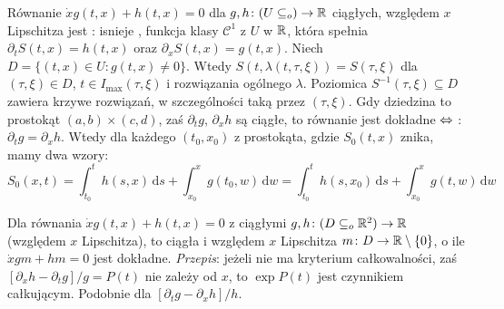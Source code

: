 Równanie $\dot x g(t, x) + h(t, x) = 0$ dla $g, h \colon (U \subseteq_o) \to \mathbb{R}$ ciągłych, względem $x$ Lipschitza jest : isnieje , funkcja klasy $\mathscr C^1$ z $U$ w $\mathbb{R}$, która spełnia $\partial_t S (t, x) = h(t, x)$ oraz $\partial_x S(t, x) = g(t, x)$.
Niech $D = \{(t, x) \in U: g(t, x) \neq 0\}$.
Wtedy $S(t, \lambda(t, \tau, \xi)) = S(\tau, \xi)$ dla $(\tau, \xi) \in D$, $t \in I_{\max}(\tau, \xi)$ i rozwiązania ogólnego $\lambda$.
Poziomica $S^{-1} (\tau, \xi) \subseteq D$ zawiera krzywe rozwiązań, w szczególności taką przez $(\tau, \xi)$.
Gdy dziedzina to prostokąt $(a,b) \times (c,d)$, zaś $\partial_tg$, $\partial_xh$ są ciągłe, to równanie jest dokładne $\Leftrightarrow$ : $\partial_t g = \partial_x h$.
Wtedy dla każdego $(t_0, x_0)$ z prostokąta, gdzie $S_0(t,x)$ znika, mamy dwa wzory:
\[
	S_0(x,t)= \int_{t_0}^t h(s,x) \,\textrm{d}s + \int_{x_0}^x g(t_0, w) \,\textrm{d}w
	= \int_{t_0}^t h(s,x_0)\,\textrm{d}s + \int_{x_0}^x g(t, w) \,\textrm{d}w
\]

Dla równania  $\dot x g(t,x) + h(t,x) = 0$ z ciągłymi  $g, h \colon (D \subseteq_o \mathbb{R}^2) \to \mathbb{R}$ (względem $x$ Lipschitza),  to ciągła i względem $x$ Lipschitza $m \colon D \to \mathbb{R} \setminus\{0\}$, o ile $\dot x g m + h m = 0$ jest dokładne.
\emph{Przepis}: jeżeli nie ma kryterium całkowalności, zaś $[\partial_x h - \partial_t g] / g = P(t)$ nie zależy od $x$, to $\exp P(t)$ jest czynnikiem całkującym. 
Podobnie dla $[\partial_t g - \partial_x h] / h$.

